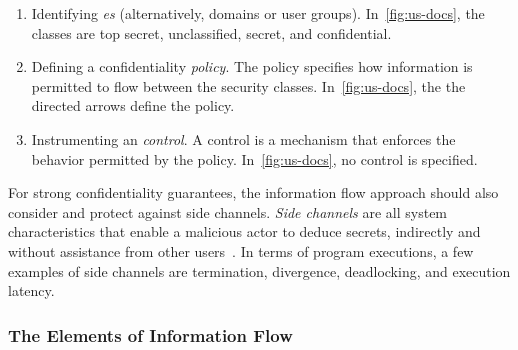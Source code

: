 \begin{enumerate} 

\item Identifying \emph{es} (alternatively, domains or user groups).
In~\autoref{fig:us-docs}, the classes are top secret, unclassified, secret, and confidential.

\item Defining a confidentiality \emph{policy}.
The policy specifies how information is permitted to flow between the security classes.
In~\autoref{fig:us-docs}, the the directed arrows define the policy.

\item Instrumenting an \emph{control}. 
A control is a mechanism that enforces the behavior permitted by the policy.
In~\autoref{fig:us-docs}, no control is specified.

\end{enumerate}

For strong confidentiality guarantees, the information flow approach should also consider and protect against side channels.
\emph{Side channels} are all system characteristics that enable a malicious actor to deduce secrets,
indirectly and without assistance from other users~\cite[p. 280]{bishop2003}.
In terms of program executions, a few examples of side channels are termination, divergence, deadlocking, and execution latency.
 
\subsubsection{The Elements of Information Flow}
\label{if-elements}

